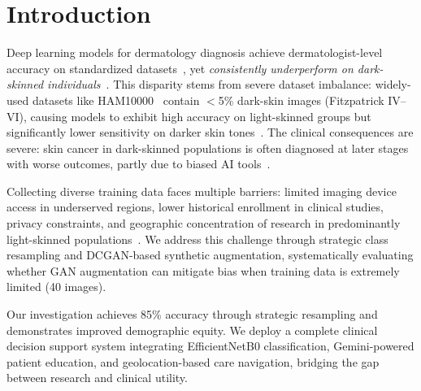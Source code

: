 \documentclass[10pt, twocolumn, letterpaper]{article}
\begin{document}
\section{Introduction}
Deep learning models for dermatology diagnosis achieve dermatologist-level accuracy on standardized datasets~\cite{esteva2017, haenssle2018}, yet \textit{consistently underperform on dark-skinned individuals}~\cite{adamson2018, daneshjou2022}. This disparity stems from severe dataset imbalance: widely-used datasets like HAM10000~\cite{tschandl2018} contain $<$5\% dark-skin images (Fitzpatrick IV--VI), causing models to exhibit high accuracy on light-skinned groups but significantly lower sensitivity on darker skin tones~\cite{kinyanjui2020}. The clinical consequences are severe: skin cancer in dark-skinned populations is often diagnosed at later stages with worse outcomes, partly due to biased AI tools~\cite{agbai2014}.

Collecting diverse training data faces multiple barriers: limited imaging device access in underserved regions, lower historical enrollment in clinical studies, privacy constraints, and geographic concentration of research in predominantly light-skinned populations~\cite{wen2022}. We address this challenge through strategic class resampling and DCGAN-based synthetic augmentation, systematically evaluating whether GAN augmentation can mitigate bias when training data is extremely limited (40 images).

Our investigation achieves 85\% accuracy through strategic resampling and demonstrates improved demographic equity. We deploy a complete clinical decision support system integrating EfficientNetB0 classification, Gemini-powered patient education, and geolocation-based care navigation, bridging the gap between research and clinical utility.
\end{document}
